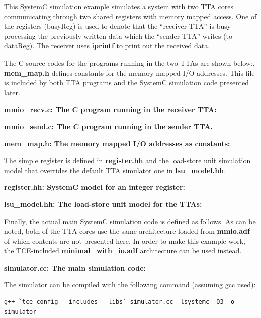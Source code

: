 \documentclass[twoside]{tceusermanual}
\begin{document}
This SystemC simulation example simulates a system with two TTA cores
communicating through two shared registers with memory mapped access.
One of the registers (busyReg) is used to denote that the ``receiver TTA'' is
busy processing the previously written data which the ``sender TTA'' writes
(to dataReg). The receiver uses \textbf{iprintf} to print out the received data.

The C source codes for the programs running in the two TTAs 
are shown below:. \textbf{mem\_map.h} defines constants for the memory 
mapped I/O addresses. This file is 
included by both TTA programs and the SystemC simulation code presented
later.

\textbf{mmio\_recv.c: The C program running in the receiver TTA:}



\textbf{mmio\_send.c: The C program running in the sender TTA.}


\textbf{mem\_map.h: The memory mapped I/O addresses as constants:}
 


The simple register is defined in \textbf{register.hh} and the
load-store unit simulation model that overrides the default TTA simulator
one in \textbf{lsu\_model.hh}.

\textbf{register.hh: SystemC model for an integer register:}
 


\textbf{lsu\_model.hh: The load-store unit model for the TTAs:}



Finally, the actual main SystemC simulation code is defined as follows.
As can be noted, both of the TTA cores use the same architecture loaded from
\textbf{mmio.adf} of which contents are not presented here. In order to 
make this example work, the TCE-included \textbf{minimal\_with\_io.adf} 
architecture can be used instead.

\textbf{simulator.cc: The main simulation code:}
 


The simulator can be compiled with the following command (assuming gcc
used):

\begin{verbatim}
g++ `tce-config --includes --libs` simulator.cc -lsystemc -O3 -o simulator
\end{verbatim}
\end{document}
